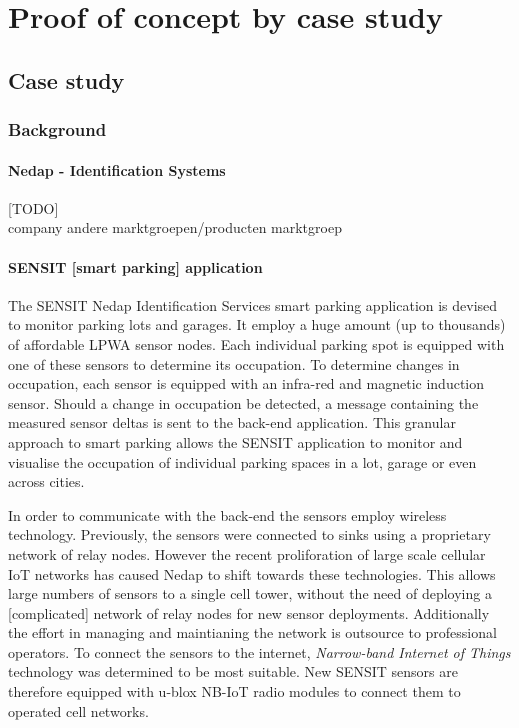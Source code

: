 \newcommand{\idsystems}{\nedap Identification Services }
\newcommand{\nedap}{Nedap }
\newcommand{\ublox}{u-blox }
\newcommand{\sensit}{SENSIT }
\chapter{Proof of concept by case study}
\label{ch:validation}
\section{Case study}
\subsection{Background}
\subsubsection*{Nedap - Identification Systems}
[TODO]\\
company
	andere marktgroepen/producten
marktgroep
\subsubsection*{\sensit [smart parking] application}
The \sensit \idsystems smart parking application is devised to monitor parking lots and garages. It employ a huge amount (up to thousands) of affordable LPWA sensor nodes. Each individual parking spot is equipped with one of these sensors to determine its occupation. To determine changes in occupation, each sensor is equipped with an infra-red and magnetic induction sensor. Should a change in occupation be detected, a message containing the measured sensor deltas is sent to the back-end application. This granular approach to smart parking allows the \sensit application to monitor and visualise the occupation of individual parking spaces in a lot, garage or even across cities.

In order to communicate with the back-end the sensors employ wireless technology. Previously, the sensors were connected to sinks using a proprietary network of relay nodes. However the recent proliforation of large scale cellular IoT networks has caused \nedap to shift towards these technologies. This allows large numbers of sensors to a single cell tower, without the need of deploying a [complicated] network of relay nodes for new sensor deployments. Additionally the effort in managing and maintianing the network is outsource to professional operators. To connect the sensors to the internet, \emph{Narrow-band Internet of Things} technology was determined to be most suitable. New \sensit sensors are therefore equipped with \ublox \cite{web:ublox} NB-IoT radio modules to connect them to operated cell networks.

